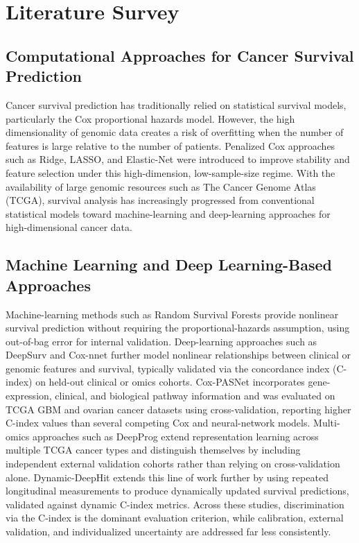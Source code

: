 \documentclass[10pt,a4paper]{article}
\begin{document}
\section{Literature Survey}

\subsection{Computational Approaches for Cancer Survival Prediction}

Cancer survival prediction has traditionally relied on statistical survival models, particularly the Cox proportional hazards model. However, the high dimensionality of genomic data creates a risk of overfitting when the number of features is large relative to the number of patients. Penalized Cox approaches such as Ridge, LASSO, and Elastic-Net were introduced to improve stability and feature selection under this high-dimension, low-sample-size regime. With the availability of large genomic resources such as The Cancer Genome Atlas (TCGA), survival analysis has increasingly progressed from conventional statistical models toward machine-learning and deep-learning approaches for high-dimensional cancer data.

\subsection{Machine Learning and Deep Learning-Based Approaches}

Machine-learning methods such as Random Survival Forests \cite{ishwaran2008random} provide nonlinear survival prediction without requiring the proportional-hazards assumption, using out-of-bag error for internal validation. Deep-learning approaches such as DeepSurv \cite{katzman2018deepsurv} and Cox-nnet \cite{ching2018coxnnet} further model nonlinear relationships between clinical or genomic features and survival, typically validated via the concordance index (C-index) on held-out clinical or omics cohorts. Cox-PASNet \cite{hao2018coxpasnet} incorporates gene-expression, clinical, and biological pathway information and was evaluated on TCGA GBM and ovarian cancer datasets using cross-validation, reporting higher C-index values than several competing Cox and neural-network models. Multi-omics approaches such as DeepProg \cite{poirion2021deepprog} extend representation learning across multiple TCGA cancer types and distinguish themselves by including independent external validation cohorts rather than relying on cross-validation alone. Dynamic-DeepHit \cite{lee2019dynamic} extends this line of work further by using repeated longitudinal measurements to produce dynamically updated survival predictions, validated against dynamic C-index metrics. Across these studies, discrimination via the C-index is the dominant evaluation criterion, while calibration, external validation, and individualized uncertainty are addressed far less consistently.
\end{document}
